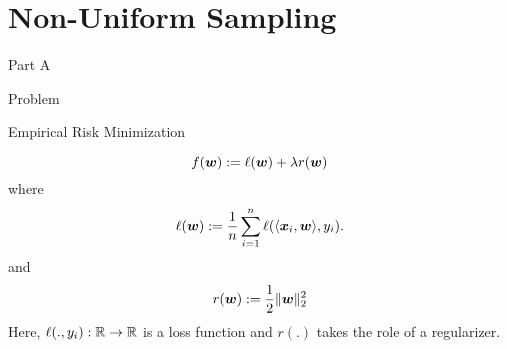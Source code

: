 \section{Non-Uniform Sampling}
\begin{frame}{Part A}
\Large \center{\color{blue}{ Non-Uniform Sampling Algorithms}}
\end{frame}

\begin{frame}{Problem}
\begin{block}{Empirical Risk Minimization}
\end{block}
\begin{equation}
    \label{eq:primalObjective}
    f(\bm{w}):= \ell(\bm{w})+\lambda r(\bm{w})
\end{equation}
where 
\begin{equation}\label{eq:someEquationName}
    \ell(\bm{w}) := \frac1n \sum_{i=1}^n \ell(\langle \bm{x}_i, \bm{w} \rangle, y_i).
\end{equation}
and 
\begin{equation}
    r(\bm{w}) := \frac12 \|\bm{w}\|_2^2
\end{equation}
Here, $\ell(.,y_i):\mathbb{R}\rightarrow\mathbb{R}$ is a loss function and $r(.)$ takes the role of a regularizer. 
\end{frame}

